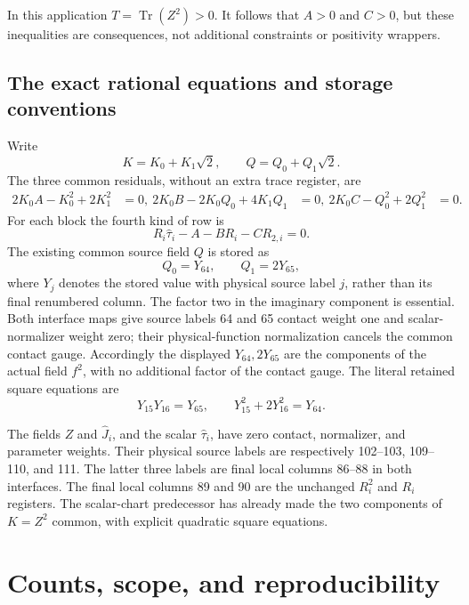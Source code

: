 \documentclass[11pt]{article}
\newcommand{\Tr}{\operatorname{Tr}}
\begin{document}
In this application \(T=\Tr(Z^2)>0\). It follows that
\(A>0\) and \(C>0\), but these inequalities are consequences,
not additional constraints or positivity wrappers.

\subsection{The exact rational equations and storage conventions}

Write
\[
 K=K_0+K_1\sqrt2,\qquad Q=Q_0+Q_1\sqrt2.
\]
The three common residuals, without an extra trace register, are
\begin{align}
 2K_0A-K_0^2+2K_1^2&=0,\
 2K_0B-2K_0Q_0+4K_1Q_1&=0,\
 2K_0C-Q_0^2+2Q_1^2&=0.                        \label{componentrows}
\end{align}
For each block the fourth kind of row is
\[
             R_i\widehat\tau_i-A-BR_i-C R_{2,i}=0.
\]
The existing common source field \(Q\) is stored as
\[
           Q_0=Y_{64},\qquad Q_1=2Y_{65},
\]
where \(Y_j\) denotes the stored value with physical source
label \(j\), rather than its final renumbered column.
The factor two in the imaginary component is essential.
Both interface maps give source labels 64 and 65 contact weight
one and scalar-normalizer weight zero; their physical-function
normalization cancels the common contact gauge. Accordingly the
displayed \(Y_{64},2Y_{65}\) are the components of the actual
field \(f^2\), with no additional factor of the contact gauge.
The literal retained square equations are
\[
 Y_{15}Y_{16}=Y_{65},\qquad
 Y_{15}^2+2Y_{16}^2=Y_{64}.
\]

The fields \(Z\) and \(\widehat J_i\), and the scalar
\(\widehat\tau_i\), have zero contact, normalizer, and parameter
weights. Their physical source labels are respectively
102--103, 109--110, and 111. The latter three labels are final
local columns 86--88 in both interfaces. The final local columns
89 and 90 are the unchanged \(R_i^2\) and \(R_i\) registers.
The scalar-chart predecessor has already made the two components
of \(K=Z^2\) common, with explicit quadratic square equations.

\section{Counts, scope, and reproducibility}
\end{document}
